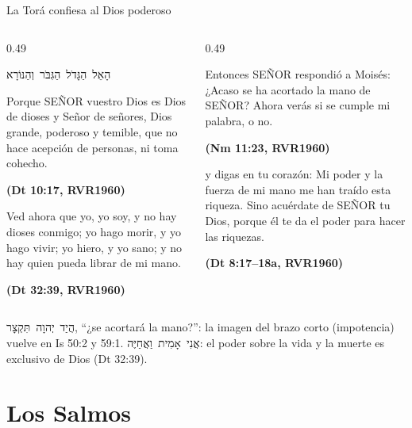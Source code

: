 \documentclass[hyperref={bookmarks=false},aspectratio=169]{beamer}
\newcommand{\heb}[1]{\mbox{\foreignlanguage{hebrew}{#1}}}
\newcommand{\SENOR}{S{\fontsize{0.78em}{1em}\selectfont EÑOR}}
\newcommand{\fuente}[1]{\par\hfill{\upshape\bfseries\footnotesize\textcolor{azul}{#1}}}
\begin{document}
\begin{frame}{La Torá confiesa al Dios poderoso}
\begin{columns}[t,onlytextwidth]
\begin{column}{0.49\textwidth}
\begin{center}\scriptsize\heb{הָאֵל הַגָּדֹל הַגִּבֹּר וְהַנּוֹרָא}\end{center}
\begin{cita}[fontupper=\scriptsize\itshape]Porque \SENOR{} vuestro Dios es Dios de dioses y Señor de señores, Dios grande, poderoso y temible, que no hace acepción de personas, ni toma cohecho.\fuente{(Dt 10:17, RVR1960)}\end{cita}
\begin{cita}[fontupper=\scriptsize\itshape]Ved ahora que yo, yo soy, y no hay dioses conmigo; yo hago morir, y yo hago vivir; yo hiero, y yo sano; y no hay quien pueda librar de mi mano.\fuente{(Dt 32:39, RVR1960)}\end{cita}
\end{column}
\begin{column}{0.49\textwidth}
\begin{cita}[fontupper=\scriptsize\itshape]Entonces \SENOR{} respondió a Moisés: ¿Acaso se ha acortado la mano de \SENOR? Ahora verás si se cumple mi palabra, o no.\fuente{(Nm 11:23, RVR1960)}\end{cita}
\begin{cita}[fontupper=\scriptsize\itshape]y digas en tu corazón: Mi poder y la fuerza de mi mano me han traído esta riqueza. Sino acuérdate de \SENOR{} tu Dios, porque él te da el poder para hacer las riquezas.\fuente{(Dt 8:17--18a, RVR1960)}\end{cita}
\end{column}
\end{columns}
\scriptsize\heb{הֲיַד יְהוָה תִּקְצָר}, ``¿se acortará la mano?'': la imagen del brazo corto (impotencia) vuelve en Is 50:2 y 59:1. \heb{אֲנִי אָמִית וַאֲחַיֶּה}: el poder sobre la vida y la muerte es exclusivo de Dios (Dt 32:39).
\end{frame}

\section{Los Salmos}
\end{document}
